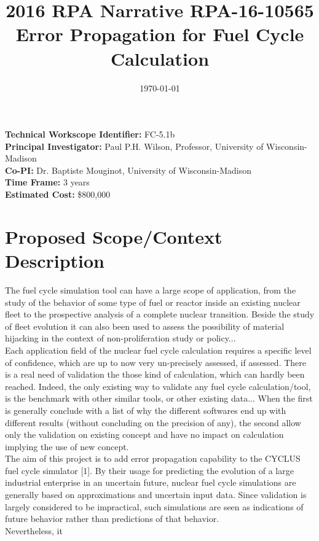 \documentclass[dvips,12pt]{article}
\title{2016 RPA Narrative RPA-16-10565\\
Error Propagation for Fuel Cycle Calculation}
\date{\today}
\begin{document}
\maketitle 



\noindent\textbf{Technical Workscope Identifier:} FC-5.1b\\
\textbf{Principal Investigator:} Paul P.H. Wilson, Professor, University of Wisconsin-Madison\\
\textbf{Co-PI:} Dr. Baptiste Mouginot, University of Wisconsin-Madison\\
\textbf{Time Frame:} 3 years\\
\textbf{Estimated Cost:} \$800,000\\


\section{Proposed Scope/Context Description}
The fuel cycle simulation tool can have a large
scope of application, from the study of the
behavior of some type of fuel or reactor inside an
existing nuclear fleet to the prospective analysis
of a complete nuclear transition. Beside the study
of fleet evolution it can also been used to assess
the possibility of material hijacking in the
context of non-proliferation study or
policy...\\ Each application field of the nuclear
fuel cycle calculation requires a specific level
of confidence, which are up to now very
un-precisely assessed, if assessed. There is a
real need of validation the those kind of
calculation, which can hardly been
reached. Indeed, the only existing way to validate
any fuel cycle calculation/tool, is the benchmark
with other similar tools, or other existing
data... When the first is generally conclude with
a list of why the different softwares end up with
different results (without concluding on the
precision of any), the second allow only the
validation on existing concept and have no impact
on calculation implying the use of new
concept.\\ The aim of this project is to add error
propagation capability to the CYCLUS fuel cycle
simulator [1]. By their usage for predicting the
evolution of a large industrial enterprise in an
uncertain future, nuclear fuel cycle simulations
are generally based on approximations and
uncertain input data.  Since validation is largely
considered to be impractical, such simulations are
seen as indications of future behavior rather than
predictions of that behavior. \\ Nevertheless, it
\end{document}
